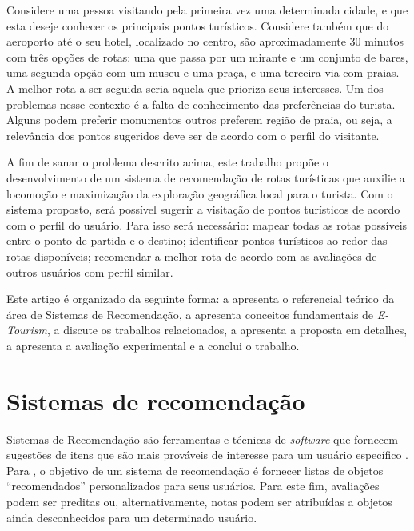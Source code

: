\documentclass[portuguese]{textolivre}
\begin{document}
Considere uma pessoa visitando pela primeira vez uma determinada cidade, e que esta deseje conhecer os principais pontos turísticos. Considere também que do aeroporto até o seu hotel, localizado no centro, são aproximadamente 30 minutos com três opções de rotas: uma que passa por um mirante e um conjunto de bares, uma segunda opção com um museu e uma praça, e uma terceira via com praias. A melhor rota a ser seguida seria aquela que prioriza seus interesses. Um dos problemas nesse contexto é a falta de conhecimento das preferências do turista. Alguns podem preferir monumentos outros preferem região de praia, ou seja, a relevância dos pontos sugeridos deve ser de acordo com o perfil do visitante. 

A fim de sanar o problema descrito acima, este trabalho propõe o desenvolvimento de um sistema de recomendação de rotas turísticas que auxilie a locomoção e maximização da exploração geográfica local para o turista. Com o sistema proposto, será possível sugerir a visitação de pontos turísticos de acordo com o perfil do usuário. Para isso será necessário: mapear todas as rotas possíveis entre o ponto de partida e o destino; identificar pontos turísticos ao redor das rotas disponíveis; recomendar a melhor rota de acordo com as avaliações de outros usuários com perfil similar.

Este artigo é organizado da seguinte forma: a  apresenta o referencial teórico da área de Sistemas de Recomendação, a  apresenta conceitos fundamentais de \textit{E-Tourism}, a  discute os trabalhos relacionados, a  apresenta a proposta em detalhes, a  apresenta a avaliação experimental e a  conclui o trabalho.

\section{Sistemas de recomendação}\label{sec_2}

Sistemas de Recomendação são ferramentas e técnicas de \textit{software} que fornecem sugestões de itens que são mais prováveis de interesse para um usuário específico \cite{ricci2015recommender}. Para \textcite{lu2012recommender}, o objetivo de um sistema de recomendação é fornecer listas de objetos ``recomendados” personalizados para seus usuários. Para este fim, avaliações podem ser preditas ou, alternativamente, notas podem ser atribuídas a objetos ainda desconhecidos para um determinado usuário.
\end{document}
